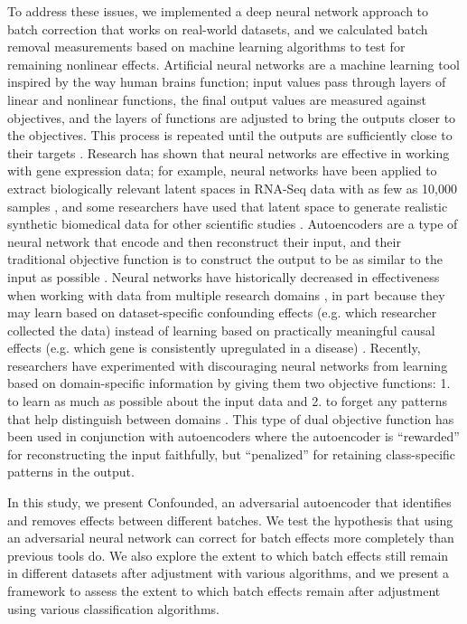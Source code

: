 \documentclass[notitlepage]{article}
\begin{document}
To address these issues, we implemented a deep neural network approach to batch correction that works on real-world datasets, and we calculated batch removal measurements based on machine learning algorithms to test for remaining nonlinear effects.
Artificial neural networks are a machine learning tool inspired by the way human brains function; input values pass through layers of linear and nonlinear functions, the final output values are measured against objectives, and the layers of functions are adjusted to bring the outputs closer to the objectives.
This process is repeated until the outputs are sufficiently close to their targets \citep{schmidhuber_deep_2015}.
Research has shown that neural networks are effective in working with gene expression data; for example, neural networks have been applied to extract biologically relevant latent spaces in RNA-Seq data with as few as 10,000 samples \citep{way_extracting_2017}, and some researchers have used that latent space to generate realistic synthetic biomedical data for other scientific studies \citep{beaulieu-jones_privacy-preserving_2017}.
Autoencoders are a type of neural network that encode and then reconstruct their input, and their traditional objective function is to construct the output to be as similar to the input as possible \citep{hinton_reducing_2006}.
Neural networks have historically decreased in effectiveness when working with data from multiple research domains \citep{ganin_domain-adversarial_2015}, in part because they may learn based on dataset-specific confounding effects (e.g. which researcher collected the data) instead of learning based on practically meaningful causal effects (e.g. which gene is consistently upregulated in a disease) \citep{louizos_causal_2017-2}.
Recently, researchers have experimented with discouraging neural networks from learning based on domain-specific information by giving them two objective functions:
1. to learn as much as possible about the input data and
2. to forget any patterns that help distinguish between domains \citep{ganin_domain-adversarial_2015,tzeng_deep_2014-2}.
This type of dual objective function has been used in conjunction with autoencoders \citep{louizos_variational_2015} where the autoencoder is ``rewarded'' for reconstructing the input faithfully, but ``penalized'' for retaining class-specific patterns in the output.

In this study, we present Confounded, an adversarial autoencoder that identifies and removes effects between different batches.
We test the hypothesis that using an adversarial neural network can correct for batch effects more completely than previous tools do.
We also explore the extent to which batch effects still remain in different datasets after adjustment with various algorithms, and we present a framework to assess the extent to which batch effects remain after adjustment using various classification algorithms.
\end{document}
